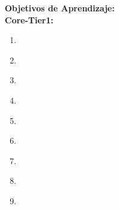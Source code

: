 \noindent \textbf{Objetivos de Aprendizaje:}\\
\noindent \textbf{Core-Tier1:}
\begin{enumerate}
	\setcounter{enumi}{0}
	\item \SDFFundamentalProgrammingConceptsLOAnalyzeAndBehavior\xspace[\SDFFundamentalProgrammingConceptsLOAnalyzeAndBehaviorLevel]\label{sec:BOK:SDFFundamentalProgrammingConceptsLOAnalyzeAndBehavior}
	\item \SDFFundamentalProgrammingConceptsLOIdentifyAndOf\xspace[\SDFFundamentalProgrammingConceptsLOIdentifyAndOfLevel]\label{sec:BOK:SDFFundamentalProgrammingConceptsLOIdentifyAndOf}
	\item \SDFFundamentalProgrammingConceptsLOWritePrograms\xspace[\SDFFundamentalProgrammingConceptsLOWriteProgramsLevel]\label{sec:BOK:SDFFundamentalProgrammingConceptsLOWritePrograms}
	\item \SDFFundamentalProgrammingConceptsLOModify\xspace[\SDFFundamentalProgrammingConceptsLOModifyLevel]\label{sec:BOK:SDFFundamentalProgrammingConceptsLOModify}
	\item \SDFFundamentalProgrammingConceptsLODesignImplement\xspace[\SDFFundamentalProgrammingConceptsLODesignImplementLevel]\label{sec:BOK:SDFFundamentalProgrammingConceptsLODesignImplement}
	\item \SDFFundamentalProgrammingConceptsLOWriteAUses\xspace[\SDFFundamentalProgrammingConceptsLOWriteAUsesLevel]\label{sec:BOK:SDFFundamentalProgrammingConceptsLOWriteAUses}
	\item \SDFFundamentalProgrammingConceptsLOChooseAppropriateIteration\xspace[\SDFFundamentalProgrammingConceptsLOChooseAppropriateIterationLevel]\label{sec:BOK:SDFFundamentalProgrammingConceptsLOChooseAppropriateIteration}
	\item \SDFFundamentalProgrammingConceptsLODescribeTheRecursion\xspace[\SDFFundamentalProgrammingConceptsLODescribeTheRecursionLevel]\label{sec:BOK:SDFFundamentalProgrammingConceptsLODescribeTheRecursion}
	\item \SDFFundamentalProgrammingConceptsLOIdentifyTheAndCase\xspace[\SDFFundamentalProgrammingConceptsLOIdentifyTheAndCaseLevel]\label{sec:BOK:SDFFundamentalProgrammingConceptsLOIdentifyTheAndCase}
\end{enumerate}


